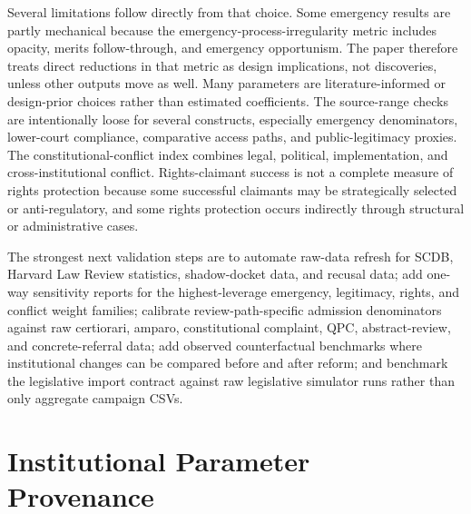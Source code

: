 \documentclass[
    journal=jlc,
    manuscript=research-article,
    year=2026,
  ]{cup-journal}
\begin{document}
Several limitations follow directly from that choice. Some emergency results are partly mechanical because the emergency-process-irregularity metric includes opacity, merits follow-through, and emergency opportunism. The paper therefore treats direct reductions in that metric as design implications, not discoveries, unless other outputs move as well. Many parameters are literature-informed or design-prior choices rather than estimated coefficients. The source-range checks are intentionally loose for several constructs, especially emergency denominators, lower-court compliance, comparative access paths, and public-legitimacy proxies. The constitutional-conflict index combines legal, political, implementation, and cross-institutional conflict. Rights-claimant success is not a complete measure of rights protection because some successful claimants may be strategically selected or anti-regulatory, and some rights protection occurs indirectly through structural or administrative cases.

The strongest next validation steps are to automate raw-data refresh for SCDB, Harvard Law Review statistics, shadow-docket data, and recusal data; add one-way sensitivity reports for the highest-leverage emergency, legitimacy, rights, and conflict weight families; calibrate review-path-specific admission denominators against raw certiorari, amparo, constitutional complaint, QPC, abstract-review, and concrete-referral data; add observed counterfactual benchmarks where institutional changes can be compared before and after reform; and benchmark the legislative import contract against raw legislative simulator runs rather than only aggregate campaign CSVs.

\appendix

\section{Institutional Parameter Provenance}
\label{app:provenance}
\end{document}
